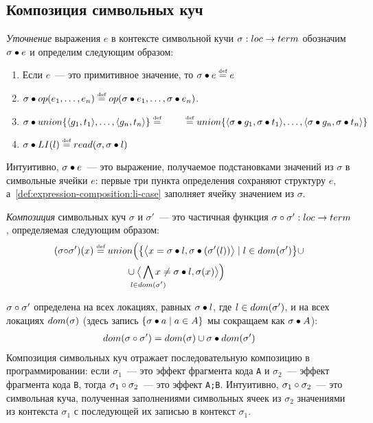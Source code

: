 \subsection{Композиция символьных куч}
\begin{defn}\label{def:expression-composition}
\emph{Уточнение} выражения $e$ в контексте символьной кучи $\sigma : loc \rightarrow term$ обозначим $\sigma\bullet e$ и определим следующим образом:
\begin{enumerate}
\item\label{def:expression-composition:leaf-case} Если $e$~--- это примитивное значение, то $\sigma\bullet e\mathrel{\stackrel{\mbox{\normalfont\tiny def}}{=}} e$
\item $\sigma\bullet op(e_1, \ldots, e_n)\mathrel{\stackrel{\mbox{\normalfont\tiny def}}{=}} op(\sigma\bullet e_1, \ldots, \sigma\bullet e_n)$.
\item\label{def:expression-composition:union-case} $\sigma\bullet union\{\langle g_1, t_1\rangle, \ldots, \langle g_n, t_n\rangle\}\mathrel{\stackrel{\mbox{\normalfont\tiny def}}{=}}\\
\qquad\mathrel{\stackrel{\mbox{\normalfont\tiny def}}{=}}union\{\langle\sigma\bullet g_1, \sigma\bullet t_1\rangle, \ldots, \langle\sigma\bullet g_n, \sigma\bullet t_n\rangle\}$
\item\label{def:expression-composition:li-case} $\sigma\bullet LI(l)\mathrel{\stackrel{\mbox{\normalfont\tiny def}}{=}}read(\sigma,\sigma\bullet l)$
\end{enumerate}
\end{defn}
%
Интуитивно, $\sigma\bullet e$~--- это выражение, получаемое подстановками значений из $\sigma$ в символьные ячейки $e$: первые три пункта определения сохраняют структуру $e$, а~\ref{def:expression-composition:li-case} заполняет ячейку значением из $\sigma$.
%
\begin{defn}\label{def:state-composition}
\emph{Композиция} символьных куч $\sigma$ и $\sigma'$~--- это частичная функция $\sigma\circ\sigma' : loc \rightarrow term$, определяемая следующим образом:
\begin{align}\notag
	(\compose{\sigma}{&\sigma'})(x)\eqdef\cmpbody{x}{\sigma'}{\sigma}{\sigma(x)}
\end{align}
\end{defn}
$\sigma\circ\sigma'$ определена на всех локациях, равных $\sigma\bullet l$, где $l\in dom(\sigma')$, и на всех локациях $dom(\sigma)$ (здесь запись $\{\sigma\bullet a \mid a\in A\}$ мы сокращаем как $\sigma\bullet A$):
\begin{align}\label{eq:domain-of-composition}
	dom(\sigma\circ\sigma') = dom(\sigma)\cup\sigma\bullet dom(\sigma')
\end{align}
%
Композиция символьных куч отражает последовательную композицию в программировании: если $\sigma_1$~--- это эффект фрагмента кода \texttt{A} и $\sigma_2$~--- эффект фрагмента кода \texttt{B}, тогда $\sigma_1\circ\sigma_2$~--- это эффект \texttt{A;B}. Интуитивно, $\sigma_1\circ\sigma_2$~--- это символьная куча, полученная заполнениями символьных ячеек из $\sigma_2$ значениями из контекста $\sigma_1$ с последующей их записью в контекст $\sigma_1$.

